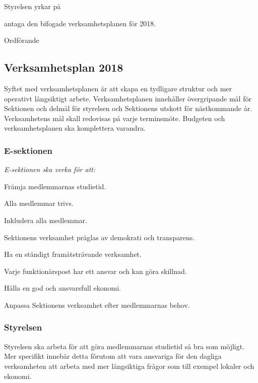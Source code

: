 \documentclass[../_main/handlingar.tex]{subfiles}
\begin{document}

Styrelsen yrkar på

\begin{attsatser}
    \att antaga den bifogade verksamhetsplanen för 2018.
\end{attsatser}

\begin{signatures}{1}
    \ist
    \signature{\ordf}{Ordförande}
\end{signatures}

\subsection*{Verksamhetsplan 2018}
Syftet med verksamhetsplanen är att skapa en tydligare struktur och mer operativt långsiktigt arbete. Verksamhetsplanen innehåller övergripande mål för Sektionen och delmål för styrelsen och Sektionens utskott för nästkommande år. Verksamhetens mål skall redovisas på varje terminsmöte. Budgeten och verksamhetsplanen ska komplettera varandra.

\subsubsection*{E-sektionen}
\emph{E-sektionen ska verka för att:}
\begin{dashlist}
    \item Främja medlemmarnas studietid.
    \item Alla medlemmar trivs.
    \item Inkludera alla medlemmar.
    \item Sektionens verksamhet präglas av demokrati och transparens.
    \item Ha en ständigt framåtsträvande verksamhet.
    \item Varje funktionärspost har ett ansvar och kan göra skillnad.
    \item Hålla en god och ansvarsfull ekonomi.
    \item Anpassa Sektionens verksamhet efter medlemmarnas behov.
\end{dashlist}

\subsubsection*{Styrelsen}
Styrelsen ska arbeta för att göra medlemmarnas studietid så bra som möjligt. Mer specifikt innebär detta förutom att vara ansvariga för den dagliga verksamheten att arbeta med mer långsiktiga frågor som till exempel lokaler och ekonomi.
\end{document}
